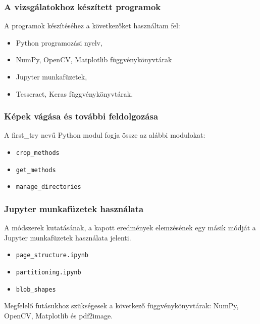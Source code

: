 \documentclass{beamer}
\begin{document}
\begin{frame}[fragile]
\frametitle{A vizsgálatokhoz készített programok}

A programok készítéséhez a következőket használtam fel:

\medskip

\begin{itemize}
    \item Python programozási nyelv,
    \item NumPy, OpenCV, Matplotlib függvénykönyvtárak
    \item Jupyter munkafüzetek,
    \item Tesseract, Keras függvénykönyvtárak.
\end{itemize}

\end{frame}

\begin{frame}[fragile]
\frametitle{Képek vágása és további feldolgozása}

A first\_try nevű Python modul fogja össze az alábbi modulokat:

\bigskip

\begin{itemize}
    \item \texttt{crop\_methods}
    \item \texttt{get\_methods}
    \item \texttt{manage\_directories}
\end{itemize}

\end{frame}

\begin{frame}[fragile]
\frametitle{Jupyter munkafüzetek használata}

A módszerek kutatásának, a kapott eredmények elemzésének egy másik módját a Jupyter munkafüzetek használata jelenti.

\bigskip

\begin{itemize}
    \item \texttt{page\_structure.ipynb}
    \item \texttt{partitioning.ipynb}
    \item \texttt{blob\_shapes}
\end{itemize}

\bigskip

Megfelelő futásukhoz szükségesek a következő függvénykönyvtárak: NumPy, OpenCV, Matplotlib és pdf2image.

\end{frame}
\end{document}

